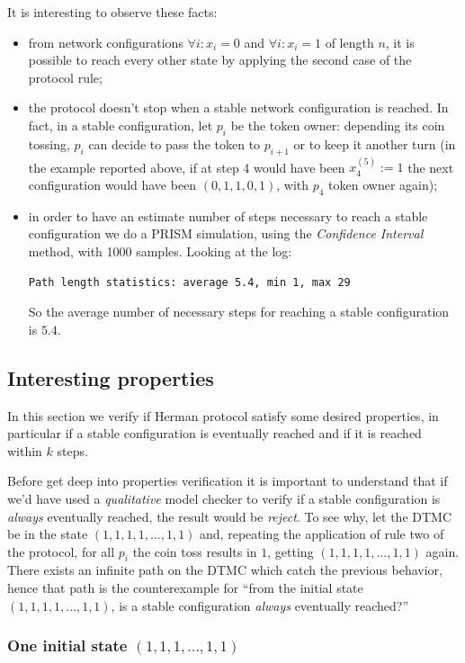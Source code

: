It is interesting to observe these facts:
\begin{itemize}
\item from network configurations $\forall i:x_i=0$ and $\forall
  i:x_i=1$ of length $n$, it is possible to reach every other state by
  applying the second case of the protocol rule;
\item the protocol doesn't stop when a stable network configuration is
  reached. In fact, in a stable configuration, let $p_i$ be the token
  owner: depending its coin tossing, $p_i$ can decide to pass the
  token to $p_{i+1}$ or to keep it another turn (in the example
  reported above, if at step 4 would have been $x_4^{(5)}:= 1$ the
  next configuration would have been $(0, 1, 1, 0, 1)$, with $p_4$
  token owner again);
\item in order to have an estimate number of steps necessary to reach
  a stable configuration we do a PRISM simulation, using the
  \emph{Confidence Interval} method, with 1000 samples. Looking at the
  log:
\begin{verbatim}
Path length statistics: average 5.4, min 1, max 29
\end{verbatim}
  So the average number of necessary steps for reaching a stable
  configuration is $5.4$.
\end{itemize}

\subsection{Interesting properties}

In this section we verify if Herman protocol satisfy some desired
properties, in particular if a stable configuration is eventually
reached and if it is reached within $k$ steps.

Before get deep into properties verification it is important to
understand that if we'd have used a \emph{qualitative} model checker
to verify if a stable configuration is \emph{always} eventually
reached, the result would be \emph{reject}. To see why, let the DTMC
be in the state $(1,1,1,1,\ldots,1,1)$ and, repeating the application
of rule two of the protocol, for all $p_i$ the coin toss results in
$1$, getting $(1,1,1,1,\ldots,1,1)$ again. There exists an infinite
path on the DTMC which catch the previous behavior, hence that path is
the counterexample for ``from the initial state
$(1,1,1,1,\ldots,1,1)$, is a stable configuration \emph{always}
eventually reached?''

\subsubsection{One initial state $(1,1,1,\ldots,1,1)$}

